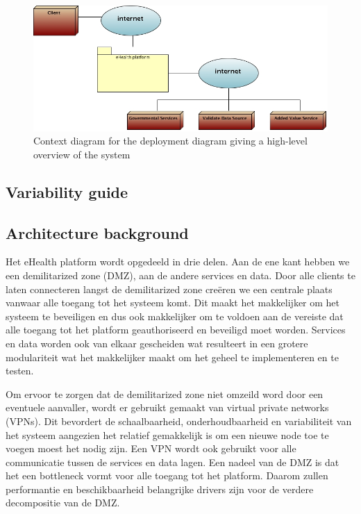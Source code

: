 \documentclass[a4paper,10pt]{article}
\begin{document}
\begin{center}
    \begin{figure}[!h]
      \includegraphics[width=\textwidth]{../images/deployment_DMZ_context.jpg}
	\caption{Context diagram for the deployment diagram giving a high-level overview of the system}
    \end{figure}
 \end{center}

\subsection{Variability guide}

\subsection{Architecture background}

Het eHealth platform wordt opgedeeld in drie delen. Aan de ene kant hebben we een demilitarized zone (DMZ), aan de andere services en data. Door alle clients te laten connecteren langst de demilitarized zone creëren we een centrale plaats vanwaar alle toegang tot het systeem komt. Dit maakt het makkelijker om het systeem te beveiligen en dus ook makkelijker om te voldoen aan de vereiste dat alle toegang tot het platform geauthoriseerd en beveiligd moet worden. Services en data worden ook van elkaar gescheiden wat resulteert in een grotere modulariteit wat het makkelijker maakt om het geheel te implementeren en te testen.

Om ervoor te zorgen dat de demilitarized zone niet omzeild word door een eventuele aanvaller, wordt er gebruikt gemaakt van virtual private networks (VPNs). Dit bevordert de schaalbaarheid, onderhoudbaarheid en variabiliteit van het systeem aangezien het relatief gemakkelijk is om een nieuwe node toe te voegen moest het nodig zijn. Een VPN wordt ook gebruikt voor alle communicatie tussen de services en data lagen. Een nadeel van de DMZ is dat het een bottleneck vormt voor alle toegang tot het platform. Daarom zullen performantie en beschikbaarheid belangrijke drivers zijn voor de verdere decompositie van de DMZ.
\end{document}

